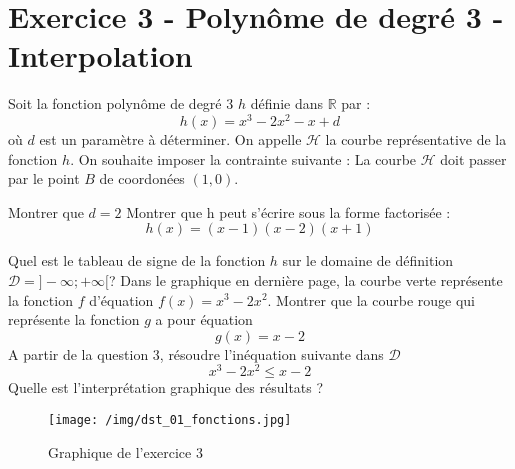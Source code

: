 \documentclass{exam}
\begin{document}
\section*{Exercice 3 - Polynôme de degré 3 - Interpolation}


Soit la fonction polynôme de degré 3 $h$ définie dans $\mathbb{R}$ par :
\[
h(x) = x^3 - 2x^2 -x + d
\]
où $d$ est un paramètre à déterminer. On appelle $\mathcal{H}$ la courbe représentative de la fonction $h$. On souhaite imposer la contrainte suivante : La courbe \(\mathcal{H}\) doit passer par le point $B$ de coordonées $(1, 0)$.

\begin{questions}

\question[1] Montrer que $d = 2$
\question[1] Montrer que h peut s'écrire sous la forme factorisée : 
\[
  h(x) = (x-1)(x-2)(x+1)
\]

\question[1] Quel est le tableau de signe de la fonction $h$ sur le domaine de définition $\mathcal{D} = ] - \infty ; + \infty [$?
\question[1] Dans le graphique en dernière page, la courbe verte représente la fonction $f$ d'équation $f(x) = x^3 - 2x^2$. Montrer que la courbe rouge qui représente la fonction $g$ a pour équation 
\[
g(x) = x - 2
\]
\question[1] A partir de la question 3, résoudre l'inéquation suivante dans $\mathcal{D}$
\[
x^3 - 2x^2 \leq x - 2
\]
Quelle est l'interprétation graphique des résultats ?

\end{questions}

\begin{figure}[H]
  \centering
  \texttt{[image: /img/dst\_01\_fonctions.jpg]}
  \caption{\label{} Graphique de l'exercice 3}
\end{figure}
\end{document}

